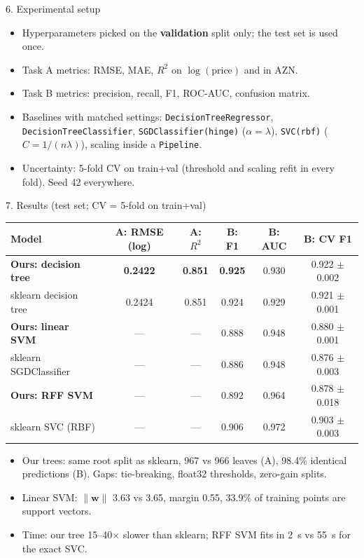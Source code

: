 \documentclass[aspectratio=169,10pt]{beamer}
\begin{document}
\begin{frame}{6. Experimental setup}
  \begin{itemize}
    \item Hyperparameters picked on the \textbf{validation} split only;
          the test set is used once.
    \item Task A metrics: RMSE, MAE, $R^2$ on $\log(\text{price})$ and in AZN.
    \item Task B metrics: precision, recall, F1, ROC-AUC, confusion matrix.
    \item Baselines with matched settings: \texttt{DecisionTreeRegressor},
          \texttt{DecisionTreeClassifier}, \texttt{SGDClassifier(hinge)}
          ($\alpha=\lambda$), \texttt{SVC(rbf)} ($C=1/(n\lambda)$),
          scaling inside a \texttt{Pipeline}.
    \item Uncertainty: 5-fold CV on train+val (threshold and scaling refit
          in every fold). Seed 42 everywhere.
  \end{itemize}
\end{frame}

\begin{frame}{7. Results (test set; CV = 5-fold on train+val)}
  \small
  \centering
  \begin{tabular}{@{}lccccc@{}}
    \toprule
    Model & A: RMSE (log) & A: $R^2$ & B: F1 & B: AUC & B: CV F1 \\
    \midrule
    \textbf{Ours: decision tree} & \textbf{0.2422} & \textbf{0.851} & \textbf{0.925} & 0.930 & 0.922 $\pm$ 0.002 \\
    sklearn decision tree        & 0.2424 & 0.851 & 0.924 & 0.929 & 0.921 $\pm$ 0.001 \\
    \textbf{Ours: linear SVM}    & --- & --- & 0.888 & 0.948 & 0.880 $\pm$ 0.001 \\
    sklearn SGDClassifier        & --- & --- & 0.886 & 0.948 & 0.876 $\pm$ 0.003 \\
    \textbf{Ours: RFF SVM}       & --- & --- & 0.892 & 0.964 & 0.878 $\pm$ 0.018 \\
    sklearn SVC (RBF)            & --- & --- & 0.906 & 0.972 & 0.903 $\pm$ 0.003 \\
    \bottomrule
  \end{tabular}

  \vspace{0.8em}
  \begin{itemize}
    \item Our trees: same root split as sklearn, 967 vs 966 leaves (A),
          98.4\% identical predictions (B). Gaps: tie-breaking, float32
          thresholds, zero-gain splits.
    \item Linear SVM: $\lVert\mathbf{w}\rVert$ 3.63 vs 3.65, margin 0.55,
          33.9\% of training points are support vectors.
    \item Time: our tree 15--40$\times$ slower than sklearn; RFF SVM fits
          in 2~s vs 55~s for the exact SVC.
  \end{itemize}
\end{frame}
\end{document}
